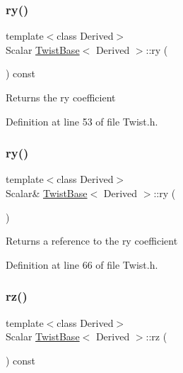 \subsubsection{\texorpdfstring{ry()}{ry()}\hspace{0.1cm}{\footnotesize\ttfamily [1/2]}}
{\footnotesize\ttfamily template$<$class Derived$>$ \\
Scalar \hyperlink{class_twist_base}{Twist\+Base}$<$ Derived $>$\+::ry (\begin{DoxyParamCaption}{ }\end{DoxyParamCaption}) const\hspace{0.3cm}{\ttfamily [inline]}}

\begin{DoxyReturn}{Returns}
the {\ttfamily ry} coefficient 
\end{DoxyReturn}


Definition at line 53 of file Twist.\+h.

\hypertarget{class_twist_base_a43c3b5462cb4f4b71283e29871b89cd1}{}\label{class_twist_base_a43c3b5462cb4f4b71283e29871b89cd1} 
\subsubsection{\texorpdfstring{ry()}{ry()}\hspace{0.1cm}{\footnotesize\ttfamily [2/2]}}
{\footnotesize\ttfamily template$<$class Derived$>$ \\
Scalar\& \hyperlink{class_twist_base}{Twist\+Base}$<$ Derived $>$\+::ry (\begin{DoxyParamCaption}{ }\end{DoxyParamCaption})\hspace{0.3cm}{\ttfamily [inline]}}

\begin{DoxyReturn}{Returns}
a reference to the {\ttfamily ry} coefficient 
\end{DoxyReturn}


Definition at line 66 of file Twist.\+h.

\hypertarget{class_twist_base_a25f415854bcf537c8aa1cc244bfdb770}{}\label{class_twist_base_a25f415854bcf537c8aa1cc244bfdb770} 
\subsubsection{\texorpdfstring{rz()}{rz()}\hspace{0.1cm}{\footnotesize\ttfamily [1/2]}}
{\footnotesize\ttfamily template$<$class Derived$>$ \\
Scalar \hyperlink{class_twist_base}{Twist\+Base}$<$ Derived $>$\+::rz (\begin{DoxyParamCaption}{ }\end{DoxyParamCaption}) const\hspace{0.3cm}{\ttfamily [inline]}}

